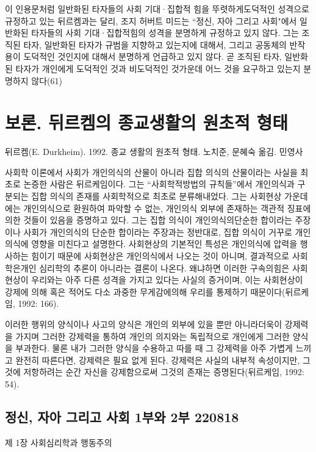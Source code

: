 \documentclass[12pt, a4paper]{article}
\begin{document}
이 인용문처럼 일반화된 타자들의 사회 기대·집합적 힘을 뚜렷하게도덕적인 성격으로 규정하고 있는 뒤르켐과는 달리, 조지 허버트 미드는 ``정신, 자아 그리고 사회"에서 일반화된 타자들의 사회 기대·집합적힘의 성격을 분명하게 규정하고 있지 않다. 그는 조직된 타자, 일반화된 타자가 규범을 지향하고 있는지에 대해서, 그리고 공동체의 반작용이 도덕적인 것인지에 대해서 분명하게 언급하고 있지 않다. 곧 조직된 타자, 일반화된 타자가 개인에게 도덕적인 것과 비도덕적인 것가운데 어느 것을 요구하고 있는지 분명하지 않다(61)

\newpage

\section{보론. 뒤르켐의 종교생활의 원초적 형태}
뒤르켐(E. Durkheim). 1992. 종교 생활의 원초적 형태. 노치준, 문혜숙 옮김. 민영사

사회학 이론에서 사회가 개인의식의 산물이 아니라 집합 의식의 산물이라는 사실을 최초로 논증한 사람은 뒤르케임이다. 그는 ``사회학적방법의 규칙들''에서 개인의식과 구분되는 집합 의식의 존재를 사회학적으로 최초로 분류해내었다. 그는 사회현상 가운데에는 개인의식으로 환원하여 파악할 수 없는, 개인의식 외부에 존재하는 객관적 징표에 의한 것들이 있음을 증명하고 있다. 그는 집합 의식이 개인의식의단순한 합이라는 주장이나 사회가 개인의식의 단순한 합이라는 주장과는 정반대로, 집합 의식이 거꾸로 개인의식에 영향을 미친다고 설명한다. 사회현상의 기본적인 특성은 개인의식에 압력을 행사하는 힘이기 때문에 사회현상은 개인의식에서 나오는 것이 아니며, 결과적으로 사회학은개인 심리학의 추론이 아니라는 결론이 나온다. 왜냐하면 이러한 구속의힘은 사회현상이 우리와는 아주 다른 성격을 가지고 있다는 사실의 증거이며, 이는 사회현상이 강제에 의해 혹은 적어도 다소 과중한 무게감에의해 우리를 통제하기 때문이다(뒤르케임, 1992: 166).

이러한 행위의 양식이나 사고의 양식은 개인의 외부에 있을 뿐만 아니라더욱이 강제력을 가지며 그러한 강제력을 통하여 개인의 의지와는 독립적으로 개인에게 그러한 양식을 부과한다. 물론 내가 그러한 양식을 수용하고 따를 때 그 강제력을 아주 가볍게 느끼고 완전히 따른다면, 강제력은 필요 없게 된다. 강제력은 사실의 내부적 속성이지만, 그것에 저항하려는 순간 자신을 강제함으로써 그것의 존재는 증명된다(뒤르케임, 1992: 54).

\newpage
\subsection{정신, 자아 그리고 사회 1부와 2부 220818}

제 1장 사회심리학과 행동주의
\end{document}

